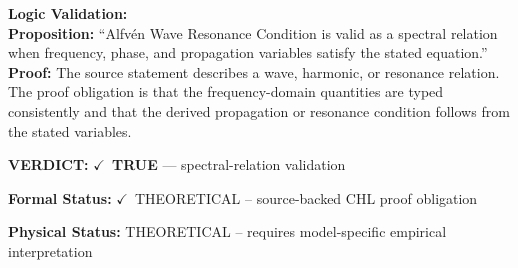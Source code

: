 \textbf{Logic Validation:}\\
\textbf{Proposition:} ``Alfvén Wave Resonance Condition is valid as a spectral relation when frequency, phase,
and propagation variables satisfy the stated equation.''\\
\textbf{Proof:} The source statement describes a wave, harmonic, or resonance relation. The proof
obligation is that the frequency-domain quantities are typed consistently and that the
derived propagation or resonance condition follows from the stated variables.

\textbf{VERDICT:} \ensuremath{\checkmark}\ \textbf{TRUE} --- spectral-relation validation

\textbf{Formal Status:} \ensuremath{\checkmark}\ THEORETICAL -- source-backed CHL proof obligation

\textbf{Physical Status:} THEORETICAL -- requires model-specific empirical interpretation
\par\vspace{0.45em}
\par
\ifTZPDarkEdition
{}
\fi
\endgroup
\endgroup
